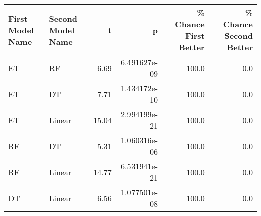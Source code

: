 \begin{tabular}{llrrrr}
\toprule
First Model Name & Second Model Name &     t &            p &  \% Chance First Better &  \% Chance Second Better \\
\midrule
              ET &                RF &  6.69 & 6.491627e-09 &                  100.0 &                     0.0 \\
              ET &                DT &  7.71 & 1.434172e-10 &                  100.0 &                     0.0 \\
              ET &            Linear & 15.04 & 2.994199e-21 &                  100.0 &                     0.0 \\
              RF &                DT &  5.31 & 1.060316e-06 &                  100.0 &                     0.0 \\
              RF &            Linear & 14.77 & 6.531941e-21 &                  100.0 &                     0.0 \\
              DT &            Linear &  6.56 & 1.077501e-08 &                  100.0 &                     0.0 \\
\bottomrule
\end{tabular}
